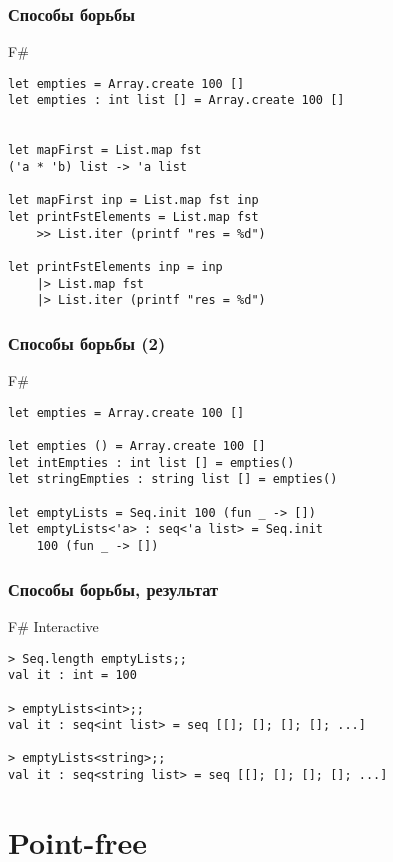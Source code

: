 \documentclass[xetex,mathserif,serif]{beamer}
\begin{document}
	\begin{frame}[fragile]
		\frametitle{Способы борьбы}
		\begin{exampleblock}{F\#}
			\begin{lstlisting}
let empties = Array.create 100 []
let empties : int list [] = Array.create 100 []


let mapFirst = List.map fst
('a * 'b) list -> 'a list

let mapFirst inp = List.map fst inp
let printFstElements = List.map fst
    >> List.iter (printf "res = %d")

let printFstElements inp = inp
    |> List.map fst
    |> List.iter (printf "res = %d")
\end{lstlisting}
\end{exampleblock}
\end{frame}

	\begin{frame}[fragile]
		\frametitle{Способы борьбы (2)}
		\begin{exampleblock}{F\#}
			\begin{lstlisting}
let empties = Array.create 100 []

let empties () = Array.create 100 []
let intEmpties : int list [] = empties()
let stringEmpties : string list [] = empties()

let emptyLists = Seq.init 100 (fun _ -> [])
let emptyLists<'a> : seq<'a list> = Seq.init 
    100 (fun _ -> [])
\end{lstlisting}
\end{exampleblock}
\end{frame}

	\begin{frame}[fragile]
		\frametitle{Способы борьбы, результат}
\begin{alertblock}{F\# Interactive}
\begin{lstlisting}[keywordstyle=\color{black}]
> Seq.length emptyLists;;
val it : int = 100

> emptyLists<int>;;
val it : seq<int list> = seq [[]; []; []; []; ...]

> emptyLists<string>;;
val it : seq<string list> = seq [[]; []; []; []; ...]
\end{lstlisting}
\end{alertblock}
\end{frame}

	\section{Point-free}
	
\end{document}
